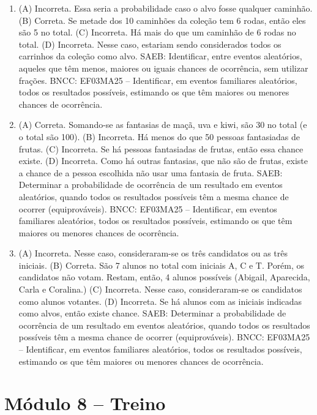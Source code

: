 \begin{enumerate}
\item
(A) Incorreta. Essa seria a probabilidade caso o alvo fosse qualquer caminhão.
(B) Correta. Se metade dos 10 caminhões da coleção tem 6 rodas, então eles são 5 no total.
(C) Incorreta. Há mais do que um caminhão de 6 rodas no total.
(D) Incorreta. Nesse caso, estariam sendo considerados todos os carrinhos da coleção como alvo.
SAEB: Identificar, entre eventos aleatórios, aqueles que têm menos, maiores ou iguais chances de ocorrência, sem utilizar frações. 
BNCC: EF03MA25 -- Identificar, em eventos familiares aleatórios, todos os resultados possíveis,
estimando os que têm maiores ou menores chances de ocorrência.

\item
(A) Correta. Somando-se as fantasias de maçã, uva e kiwi, são 30 no total (e o total são 100).
(B) Incorreta. Há menos do que 50 pessoas fantasiadas de frutas.
(C) Incorreta. Se há pessoas fantasiadas de frutas, então essa chance existe.
(D) Incorreta. Como há outras fantasias, que não são de frutas, existe a chance de a pessoa escolhida não usar uma fantasia de fruta.
SAEB: Determinar a probabilidade de ocorrência de um resultado em eventos aleatórios, quando todos os resultados possíveis têm a mesma chance de ocorrer (equiprováveis).  
BNCC: EF03MA25 -- Identificar, em eventos familiares aleatórios, todos os resultados possíveis,
estimando os que têm maiores ou menores chances de ocorrência.

\item
(A) Incorreta. Nesse caso, consideraram-se os três candidatos ou as três iniciais.
(B) Correta. São 7 alunos no total com iniciais A, C e T. Porém, os candidatos não votam. Restam, então, 4 alunos possíveis (Abigail, Aparecida, Carla e Coralina.)
(C) Incorreta. Nesse caso, consideraram-se os candidatos como alunos votantes.
(D) Incorreta. Se há alunos com as iniciais indicadas como alvos, então existe chance.
SAEB: Determinar a probabilidade de ocorrência de um resultado em eventos aleatórios, quando todos os resultados possíveis têm a mesma chance de ocorrer (equiprováveis). 
BNCC: EF03MA25 -- Identificar, em eventos familiares aleatórios, todos os resultados possíveis,
estimando os que têm maiores ou menores chances de ocorrência.
\end{enumerate}

\section*{Módulo 8 -- Treino}

